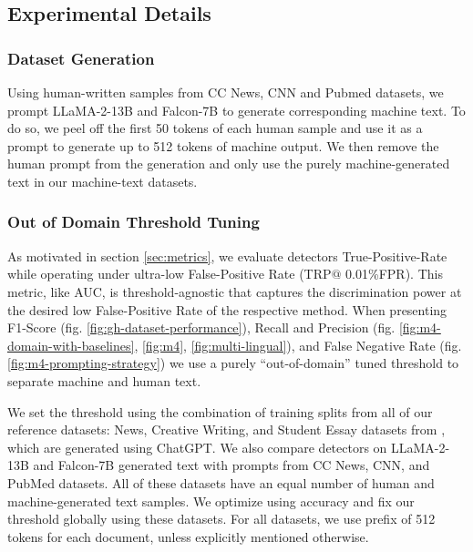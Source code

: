 \documentclass{article} %
\begin{document}
\label{sec:appendix-experiments}
\subsection{Experimental Details}

\subsubsection{Dataset Generation}
\label{sec:appendix-experiments-data-gen}

Using human-written samples from CC News, CNN and Pubmed datasets, we prompt LLaMA-2-13B and Falcon-7B to generate corresponding machine text. To do so, we peel off the first 50 tokens of each human sample and use it as a prompt to generate up to 512 tokens of machine output.
We then remove the human prompt from the generation and only use the purely machine-generated text in our machine-text datasets. 

\subsubsection{Out of Domain Threshold Tuning}
\label{sec:appendix-threshold}


As motivated in section \ref{sec:metrics}, we evaluate detectors True-Positive-Rate while operating under ultra-low False-Positive Rate (TRP$@$ 0.01\%FPR). This metric, like AUC, is threshold-agnostic that captures the discrimination power at the desired low False-Positive Rate of the respective method.  When presenting F1-Score (fig. \ref{fig:gh-dataset-performance}), Recall and Precision (fig. \ref{fig:m4-domain-with-baselines}, \ref{fig:m4}, \ref{fig:multi-lingual}), and False Negative Rate (fig. \ref{fig:m4-prompting-strategy}) we use a purely ``out-of-domain'' tuned threshold to separate machine and human text. 


We set the threshold using the combination of training splits from all of our reference datasets: News, Creative Writing, and Student Essay datasets from \citet{verma_ghostbuster_2023}, which are generated using ChatGPT.  We also compare detectors on LLaMA-2-13B and Falcon-7B generated text with prompts from CC News, CNN, and PubMed datasets. All of these datasets have an equal number of human and machine-generated text samples. We optimize using accuracy and fix our threshold globally using these datasets. For all datasets, we use prefix of 512 tokens for each document, unless explicitly mentioned otherwise. 
\end{document}
